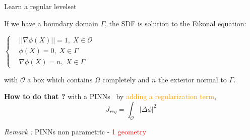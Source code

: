 \begin{frame}{Learn a regular levelset}	
	\vspace{-10pt}
	\begin{tcolorbox}[
		colback=other, %
		colframe=other, %
		arc=2mm, %
		boxrule=0.5pt, %
		breakable, enhanced jigsaw,
		width=\linewidth,
		opacityback=0.1
		]
		
		If we have a boundary domain $\Gamma$, the SDF is solution to the Eikonal equation:
		
		\begin{minipage}{0.7\linewidth}
			\hspace{100pt}
			$\left\{\begin{aligned}
				&||\nabla\phi(X)||=1, \; X\in\mathcal{O} \\
				&\phi(X)=0, \; X\in\Gamma \\
				&\nabla\phi(X)=n, \; X\in\Gamma
			\end{aligned}\right.$
		\end{minipage}
		\begin{minipage}{0.25\linewidth}
			\centering
		\end{minipage}
		
		with $\mathcal{O}$ a box which contains $\Omega$ completely and $n$ the exterior normal to $\Gamma$.
	\end{tcolorbox}

	\textbf{How to do that ?} with a PINNs \footnotesize\citep{clemot_neural_2023}\normalsize ~by \textcolor{orange}{adding a regularization term},
	\vspace{-5pt}
	\begin{equation*}
		J_{reg} = \int_\mathcal{O} |\Delta\phi|^2
	\end{equation*}

	\begin{minipage}{0.32\linewidth}
		\centering
	\end{minipage} 
	\begin{minipage}{0.32\linewidth}
		\centering
	\end{minipage} 
	\begin{minipage}{0.32\linewidth}
		\centering
	\end{minipage} 

	\footnotesize
	\textit{Remark :} PINNs non parametric - \textcolor{red}{1 geometry}
\end{frame}

